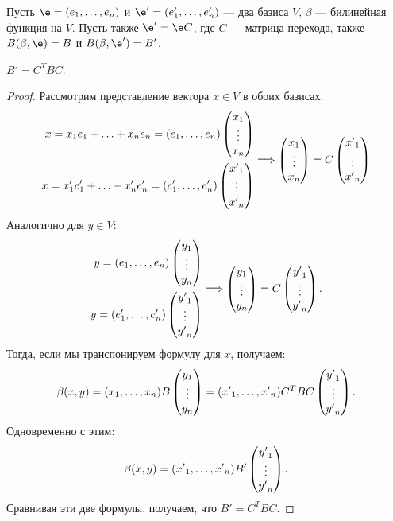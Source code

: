 Пусть $\e = (e_1, \ldots, e_n)$ и $\e' = (e'_1, \ldots, e'_n)$ --- два базиса $V$, $\beta$ --- билинейная функция на $V$. Пусть также $\e' = \e C$, где $C$ --- матрица перехода, также $B(\beta, \e) = B$ и $B(\beta, \e') = B'$.

\begin{Suggestion}
$B' = C^TBC$.
\end{Suggestion}

\begin{proof}
Рассмотрим представление вектора $x \in V$ в обоих базисах.
\begin{gather*}
\begin{aligned}
x = x_1e_1 + \ldots + x_ne_n = (e_1, \ldots, e_n)\begin{pmatrix}{x}_1 \\\vdots\\{x}_n\end{pmatrix} \\
x = x'_1e'_1 + \ldots + x'_ne'_n = (e'_1, \ldots, e'_n) \begin{pmatrix}{x'}_1 \\\vdots\\{x'}_n\end{pmatrix}
\end{aligned}
\Longrightarrow
\begin{pmatrix}{x}_1 \\\vdots\\{x}_n\end{pmatrix} = C\begin{pmatrix}{x'}_1 \\\vdots\\{x'}_n\end{pmatrix}
\end{gather*}
Аналогично для $y \in V$:
\begin{gather*}
\begin{aligned}
y = (e_1, \ldots, e_n)\begin{pmatrix}{y}_1 \\\vdots\\{y}_n\end{pmatrix} \\
y = (e'_1, \ldots, e'_n) \begin{pmatrix}{y'}_1 \\\vdots\\{y'}_n\end{pmatrix}
\end{aligned}
\Longrightarrow
\begin{pmatrix}{y}_1 \\\vdots\\{y}_n\end{pmatrix} = C\begin{pmatrix}{y'}_1 \\\vdots\\{y'}_n\end{pmatrix}.
\end{gather*}
Тогда,  если мы транспонируем формулу для $x$, получаем:
$$
\beta(x, y) = ({x}_1, \ldots, {x}_n)B\begin{pmatrix}{y}_1 \\\vdots\\{y}_n\end{pmatrix} = ({x'}_1, \ldots, {x'}_n)C^TBC\begin{pmatrix}{y'}_1 \\\vdots\\{y'}_n\end{pmatrix}.
$$
Одновременно с этим:
$$
\beta(x, y) = ({x'}_1, \ldots, {x'}_n)B'\begin{pmatrix}{y'}_1 \\\vdots\\{y'}_n\end{pmatrix}.
$$
Сравнивая эти две формулы, получаем, что $B' = C^TBC$.
\end{proof}
